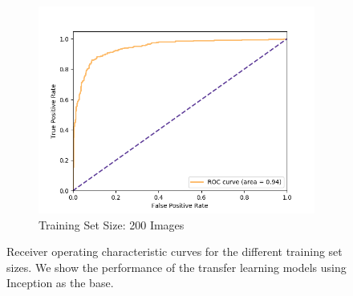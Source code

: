 \begin{figure}[!h]
\begin{subfigure}{.48\textwidth}
        \includegraphics[width=\textwidth]{images/score-100-roc.png}
        \caption{Training Set Size: 200 Images}
    \end{subfigure}
  
  \caption{Receiver operating characteristic curves for the different training set sizes. We show the performance of the transfer learning models using Inception as the base.}
  \label{fig:roc}
\end{figure}







